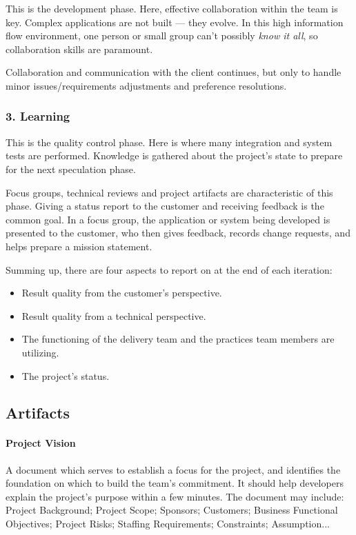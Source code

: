 \documentclass[main.tex]{subfiles}
\begin{document}
This is the development phase. Here, effective collaboration within the team is key. Complex applications are not built --- they evolve. In this high information flow environment, one person or small group can't possibly \textsl{know it all}, so collaboration skills are paramount.

Collaboration and communication with the client continues, but only to handle minor issues/requirements adjustments and preference resolutions.

\subsubsection[Learning]{3. Learning}

This is the quality control phase. Here is where many integration and system tests are performed. Knowledge is gathered about the project's state to prepare for the next speculation phase.

Focus groups, technical reviews and project artifacts are characteristic of this phase. Giving a status report to the customer and receiving feedback is the common goal. In a focus group, the application or system being developed is presented to the customer, who then gives feedback, records change requests, and helps prepare a mission statement.

Summing up, there are four aspects to report on at the end of each iteration:

\begin{itemize}
	\item Result quality from the customer's perspective.
	\item Result quality from a technical perspective.
	\item The functioning of the delivery team and the practices team members are utilizing.
	\item The project's status.
\end{itemize}

\subsection{Artifacts}

\paragraph{Project Vision}
A document which serves to establish a focus for the project,\supercite{adaptive-collaborative} and identifies the foundation on which to build the team's commitment.
It should help developers explain the project's purpose within a few minutes. The document may include: Project Background; Project Scope; Sponsors; Customers; Business Functional Objectives; Project Risks; Staffing Requirements; Constraints; Assumption...
\end{document}
